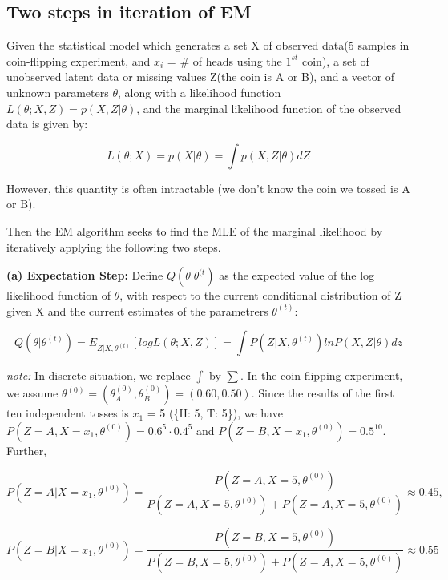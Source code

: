 \documentclass[11pt]{scrartcl} %
\begin{document}
\subsection{Two steps in iteration of EM}

 Given the statistical model which generates a set X of observed data(5 samples in coin-flipping experiment, and $x_i$ = \# of heads using the $1^{st}$ coin), a set of unobserved latent data or missing values Z(the coin is A or B), and a vector of unknown parameters $\theta$, along with a likelihood function $L(\theta; X, Z) = p(X, Z| \theta)$,  and the marginal likelihood function of the observed data is given by:

$$L(\theta; X) = p(X| \theta) = \int p(X, Z| \theta)dZ$$

However, this quantity is often intractable (we don't know the coin we tossed is A or B). 

Then the EM algorithm seeks to find the MLE of the marginal likelihood by iteratively applying the following two steps.

\textbf{(a) Expectation Step:} Define $Q(\theta| \theta^{(t})$ as the expected value of the log likelihood function of $\theta$, with respect to the current conditional distribution of Z given X and the current estimates of the parametrers $\theta^{(t)}$:

$$Q(\theta|\theta^{(t)}) = E_{Z|X,\theta^{(t)}}[logL(\theta; X, Z)] = \int P(Z|X, \theta^{(t)}) ln P(X, Z| \theta)dz $$

\textit{note:} In discrete situation, we replace $\int$ by $\sum$.  In the coin-flipping experiment, we assume $\theta^{(0)} = (\theta_A^{(0)}, \theta_B^{(0)}) = (0.60, 0.50)$. Since the results of the first ten independent tosses is $x_1$ = 5 (\{H: 5, T: 5\}), we have $P(Z = A, X=x_1, \theta^{(0)}) = 0.6^5 \cdot 0.4^5$ and $P(Z = B, X=x_1, \theta^{(0)}) = 0.5^{10}$. Further,

$$P(Z = A|X = x_1, \theta^{(0)}) = \frac{P(Z = A, X=5, \theta^{(0)})}{P(Z = A, X=5, \theta^{(0)}) + P(Z = A, X=5, \theta^{(0)})} \approx 0.45,$$ 

$$P(Z = B|X = x_1, \theta^{(0)}) = \frac{P(Z = B, X=5, \theta^{(0)})}{P(Z = B, X=5, \theta^{(0)}) + P(Z = A, X=5, \theta^{(0)})} \approx 0.55$$




\end{document}
